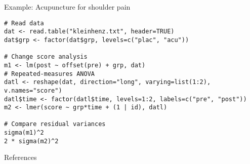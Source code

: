 \documentclass[aspectratio=169]{beamer}
\begin{document}
{


\begin{frame}[fragile]{Example: Acupuncture for shoulder pain}
\begin{lstlisting}
# Read data
dat <- read.table("kleinhenz.txt", header=TRUE)
dat$grp <- factor(dat$grp, levels=c("plac", "acu"))

# Change score analysis
m1 <- lm(post ~ offset(pre) + grp, dat)
# Repeated-measures ANOVA
datl <- reshape(dat, direction="long", varying=list(1:2), v.names="score")
datl$time <- factor(datl$time, levels=1:2, labels=c("pre", "post"))
m2 <- lmer(score ~ grp*time + (1 | id), datl)

# Compare residual variances
sigma(m1)^2
2 * sigma(m2)^2
\end{lstlisting}
\end{frame}

}


% 
% 
% 

\begin{frame}{References}


\vfill
\end{frame}
\end{document}
